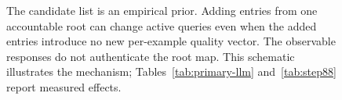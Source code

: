 \begin{figure}[!h]
{
}%
\caption{The candidate list is an empirical prior. Adding entries from one accountable root can change active queries even when the added entries introduce no new per-example quality vector. The observable responses do not authenticate the root map. This schematic illustrates the mechanism; Tables~\ref{tab:primary-llm} and~\ref{tab:step88} report measured effects.}
\label{fig:registry-refinement}
\end{figure}
